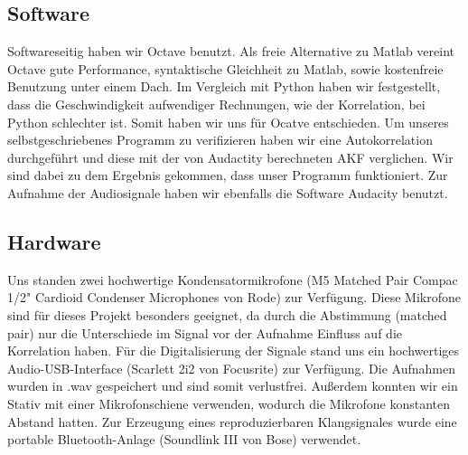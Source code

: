 \subsection{Software}
Softwareseitig haben wir Octave benutzt. Als freie Alternative zu Matlab vereint Octave gute Performance, syntaktische Gleichheit zu Matlab, sowie kostenfreie Benutzung unter einem Dach. Im Vergleich mit Python haben wir festgestellt, dass die Geschwindigkeit aufwendiger Rechnungen, wie der Korrelation, bei Python schlechter ist. Somit haben wir uns für Ocatve entschieden. Um unseres selbstgeschriebenes Programm zu verifizieren haben wir eine Autokorrelation durchgeführt und diese mit der von Audactity berechneten AKF verglichen. Wir sind dabei zu dem Ergebnis gekommen, dass unser Programm funktioniert. Zur Aufnahme der Audiosignale haben wir ebenfalls die Software Audacity benutzt.
\subsection{Hardware}
Uns standen zwei hochwertige Kondensatormikrofone (M5 Matched Pair Compac 1/2" Cardioid Condenser Microphones von Rode) zur Verfügung. Diese Mikrofone sind für dieses Projekt besonders geeignet, da durch die Abstimmung (matched pair) nur die Unterschiede im Signal vor der Aufnahme Einfluss auf die Korrelation haben. Für die Digitalisierung der Signale stand uns ein hochwertiges Audio-USB-Interface (Scarlett 2i2 von Focusrite) zur Verfügung. Die Aufnahmen wurden in .wav gespeichert und sind somit verlustfrei. Außerdem konnten wir ein Stativ mit einer Mikrofonschiene verwenden, wodurch die Mikrofone konstanten Abstand hatten. Zur Erzeugung eines reproduzierbaren Klangsignales wurde eine portable Bluetooth-Anlage (Soundlink III von Bose) verwendet.

